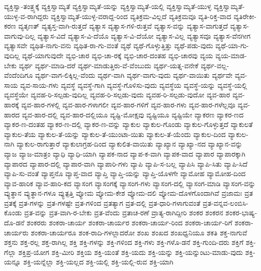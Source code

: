 {ವ್ಯಕ್ತಿಸ್ವಾ-ತಂತ್ರ್ಯಕ್ಕೆ
ವ್ಯಕ್ತಿಸ್ವಾಮ್ಯತೆ
ವ್ಯಕ್ತಿಸ್ವಾಮ್ಯತೆ-ಯನ್ನು
ವ್ಯಕ್ತಿಸ್ವಾಮ್ಯತೆ-ಯಲ್ಲಿ
ವ್ಯಕ್ತಿಸ್ವಾಮ್ಯತೆ-ಯುಳ್ಳ
ವ್ಯಕ್ತಿಸ್ವಾಮ್ಯತೆ-ಯುಳ್ಳ-ವ-ರಾಗಿದ್ದರು
ವ್ಯಕ್ತಿಸ್ವಾಮ್ಯತೆ-ಯುಳ್ಳ-ವರಾದ್ದ-ರಿಂದ
ವ್ಯತಿಕ್ರಮ-ವಿಲ್ಲದೆ
ವ್ಯತಿಕ್ರಮವೂ
ವ್ಯತಿ-ರಿಕ್ತ-ವಾದ
ವ್ಯತಿರೇಕೀ-ಕರಣ
ವ್ಯತೃಣತ್
ವ್ಯತ್ಯಸ್ತ-ವಾಗಿ-ರುತ್ತದೆ
ವ್ಯತ್ಯಾಸ
ವ್ಯತ್ಯಾಸ-ಗಳಿ-ರುತ್ತವೆ
ವ್ಯತ್ಯಾಸ-ವನ್ನು
ವ್ಯತ್ಯಾಸ-ವಾಗುತ್ತದೆ
ವ್ಯತ್ಯಾಸ-ವಾಗುವು-ದಿಲ್ಲ
ವ್ಯತ್ಯಾಸ-ವಿದೆ
ವ್ಯತ್ಯಾಸ-ವಿ-ದೆಯೊ
ವ್ಯತ್ಯಾಸ-ವಿ-ದೆಯೋ
ವ್ಯತ್ಯಾಸ-ವಿಲ್ಲ
ವ್ಯತ್ಯಾಸವೂ
ವ್ಯತ್ಯಾಸ-ವೆನಗೀಗ
ವ್ಯತ್ಯಾಸವೇ
ವ್ಯಥಿತ-ನಾಗು-ವನು
ವ್ಯಥಿತ-ರಾ-ಗು-ವಂತೆ
ವ್ಯಥೆ
ವ್ಯಥೆ-ಗೊಳ್ಳುತ್ತಿತ್ತು
ವ್ಯಥೆ-ಪಡು-ವುದು
ವ್ಯಥೆ-ಯಾ-ಗು-ವುದಿಲ್ಲ
ವ್ಯಥೆ-ಯಾಗುವುದೇ
ವ್ಯಭಿ-ಚಾರ
ವ್ಯಭಿ-ಚಾ-ರಕ್ಕೆ
ವ್ಯಭಿ-ಚಾರ-ದಂತಹ
ವ್ಯಭಿ-ಚಾರವು
ವ್ಯಯ
ವ್ಯಯ-ಮಾಡ-ಬೇಕು
ವ್ಯರ್ಥ
ವ್ಯರ್ಥ-ಮಾಡಿ-ದರೆ
ವ್ಯರ್ಥ-ಮಾಡುತ್ತಿರು-ವೆ-ವೆಂಬುದು
ವ್ಯರ್ಥ-ಯತ್ನ-ವನೇಕೆ
ವ್ಯರ್ಥ-ವಲ್ಲ-ವೆಂದೆಂದಿಗೂ
ವ್ಯರ್ಥ-ವಾಗ-ಲಿಕ್ಕಿಲ್ಲ-ವೆಂದು
ವ್ಯರ್ಥ-ವಾಗಿ
ವ್ಯರ್ಥ-ವಾಗು-ವುದು
ವ್ಯರ್ಥ-ವಾಯಿತು
ವ್ಯರ್ಥವೇ
ವ್ಯವ-ಸಾಯ
ವ್ಯವ-ಸಾಯ-ಗಳು
ವ್ಯವಸ್ಥೆ
ವ್ಯವಸ್ಥೆ-ಗಾಗಿ
ವ್ಯವಸ್ಥೆ-ಗೊಳಿಸು-ವುದು
ವ್ಯವಸ್ಥೆಯ
ವ್ಯವಸ್ಥೆ-ಯನ್ನು
ವ್ಯವಸ್ಥೆ-ಯಲ್ಲಿ
ವ್ಯವಸ್ಥೆಯೇ
ವ್ಯವಹ-ರಿ-ಸಲ್ಪಡು-ವುದಿಲ್ಲ
ವ್ಯವಹ-ರಿ-ಸಲ್ಪಡು-ವುದು
ವ್ಯವಹ-ರಿ-ಸಲ್ಪಡು-ವುದೋ
ವ್ಯವ-ಹಾರ
ವ್ಯವ-ಹಾರಕ್ಕೆ
ವ್ಯವ-ಹಾರ-ಗಳಲ್ಲಿ
ವ್ಯವ-ಹಾರ-ಗಳಾಗಲೀ
ವ್ಯವ-ಹಾರ-ಗಳಿಗೆ
ವ್ಯವ-ಹಾರ-ಗಳು
ವ್ಯವ-ಹಾರ-ಗಳೆಲ್ಲವೂ
ವ್ಯವ-ಹಾರದ
ವ್ಯವ-ಹಾರ-ದಲ್ಲಿ
ವ್ಯವ-ಹಾರ-ದಲ್ಲಿಯೂ
ವ್ಯಷ್ಟಿ-ಮೋಕ್ಷವು
ವ್ಯಷ್ಟಿಯೂ
ವ್ಯಷ್ಟಿಯೇ
ವ್ಯಾಕರಣ
ವ್ಯಾಕರ-ಣದ
ವ್ಯಾಕರ-ಣ-ದಂತಹ
ವ್ಯಾಕರ-ಣ-ದಲ್ಲಿ
ವ್ಯಾಕರ-ಣ-ವನ್ನು
ವ್ಯಾಕುಲ
ವ್ಯಾಕುಲ-ಗೊಂಡು
ವ್ಯಾಕುಲ-ಗೊಳ್ಳುತ್ತದೆ
ವ್ಯಾಕುಲತೆ
ವ್ಯಾಕುಲ-ತೆಯ
ವ್ಯಾಕುಲ-ತೆ-ಯನ್ನು
ವ್ಯಾಕುಲ-ತೆ-ಯುಂಟಾ-ಯಿತು
ವ್ಯಾಕುಲ-ತೆ-ಯೆಂದು
ವ್ಯಾಕುಲ-ದಿಂದ
ವ್ಯಾಕುಲ-ನಾಗಿ
ವ್ಯಾಕುಲ-ರಾಗುತ್ತಾರೆ
ವ್ಯಾಕುಲಾಗ್ರಹ-ದಿಂದ
ವ್ಯಾಕುಲಿತ-ವಾಯಿತು
ವ್ಯಾಖ್ಯಾನ
ವ್ಯಾಖ್ಯಾ-ನದ
ವ್ಯಾಖ್ಯಾನ-ವನ್ನು
ವ್ಯಾಜ
ವ್ಯಾಜ-ಮಾತ್ರಂ
ವ್ಯಾಧಿ
ವ್ಯಾಧಿ-ಯಾಗಿ
ವ್ಯಾಪಕ-ನಾದ
ವ್ಯಾಪ-ಕ-ವಾಗಿ
ವ್ಯಾಪಕ-ವಾದ
ವ್ಯಾಪಾರ
ವ್ಯಾಪಾರಕ್ಕಾಗಿ
ವ್ಯಾಪಾರದ
ವ್ಯಾಪಾರ-ದಲ್ಲಿ
ವ್ಯಾಪಾರ-ವಾಗಿ
ವ್ಯಾಪಾರಿ-ಗಳು
ವ್ಯಾಪಿ
ವ್ಯಾಪಿ-ಸ-ಬಲ್ಲ
ವ್ಯಾಪಿಸಿ
ವ್ಯಾಪಿ-ಸಿತು
ವ್ಯಾಪಿ-ಸಿದೆ
ವ್ಯಾಪಿ-ಸು-ವಂತೆ
ವ್ಯಾಪ್ತನೊ
ವ್ಯಾಪ್ತ-ವಾದ
ವ್ಯಾಪ್ತಿ
ವ್ಯಾಪ್ತಿ-ಯನ್ನು
ವ್ಯಾಪ್ತಿ-ಯೊಳಗೇ
ವ್ಯಾಮೋಹ
ವ್ಯಾಮೋಹ-ದಿಂದ
ವ್ಯಾವ-ಹಾರಿಕ
ವ್ಯಾವ-ಹಾರಿ-ಕದ
ವ್ಯಾಸಂಗ
ವ್ಯಾಸಂಗಕ್ಕೆ
ವ್ಯಾಸಂಗ-ಗಳು
ವ್ಯಾಸಂಗ-ದಲ್ಲಿ
ವ್ಯಾಸಂಗ-ಮಾಡಿ
ವ್ಯಾಸಂಗ-ವನ್ನು
ವ್ಯುತ್ಥಾನ
ವ್ಯುತ್ಥಾನ-ಗಳೂ
ವ್ಯುತ್ಪತ್ತಿ
ವ್ಯೋಮ
ವ್ಯೋಮ-ಕೇಶ
ವ್ಯೋಮ-ದಲಿ
ವ್ಯೋಮ-ದೊಳಗೊಂದಾಗಿವೆ
ವ್ರಜಾಮಃ
ವ್ರತ
ವ್ರತಕ್ಕೆ
ವ್ರತ-ಗಳನ್ನು
ವ್ರತ-ಗಳಷ್ಟೇ
ವ್ರತ-ಗಳಿಂದ
ವ್ರತತ್ಯಾಗ
ವ್ರತ-ದಲ್ಲಿ
ವ್ರತ-ಧಾರಿ-ಗಳಾಗುವಂತೆ
ವ್ರತ-ವನ್ನವ-ಲಂಬಿಸಿ-ಕೊಂಡು
ವ್ರತ-ವನ್ನು
ವ್ರತ-ವಾಗಿ-ರ-ಬೇಕು
ವ್ರತ-ವೆಂದು
ವ್ರತಾಚ-ರಣೆ
ವ್ರಾತ್ಯ-ರಾಗಿದ್ದೀರಿ
ಶಂಕರ
ಶಂಕರನ
ಶಂಕರ-ಭಾಷ್ಯ-ದೊ-ಡನೆ
ಶಂಕರರು
ಶಂಕರಾ-ಚಾರ್ಯ
ಶಂಕರಾ-ಚಾರ್ಯರ
ಶಂಕರಾ-ಚಾರ್ಯ-ರಿಂದ
ಶಂಕರಾ-ಚಾರ್ಯ-ರಿಗೆ
ಶಂಕರಾ-ಚಾರ್ಯರು
ಶಂಕರಾ-ಚಾರ್ಯರೂ
ಶಂಕ-ರಾದಿ-ಗಳಲ್ಲಾದರೋ
ಶಂಖ
ಶಂಖದ
ಶಂಖಧ್ವನಿಯೂ
ಶಕತಿ
ಶಕ್ತ-ನಾಗುವೆ
ಶಕ್ತನು
ಶಕ್ತ-ರಲ್ಲ
ಶಕ್ತ-ರಾಗಿಲ್ಲ
ಶಕ್ತಿ
ಶಕ್ತಿ-ಗಳನ್ನು
ಶಕ್ತಿ-ಗಳಿಂದ
ಶಕ್ತಿ-ಗಳು
ಶಕ್ತಿ-ಗಳೊ-ಡನೆ
ಶಕ್ತಿ-ಗುಂದಿ-ದರು
ಶಕ್ತಿಗೆ
ಶಕ್ತಿ-ಗೆಲ್ಲಾ
ಶಕ್ತಿಪ್ರ-ಯೋಗ
ಶಕ್ತಿ-ಮೀರಿ
ಶಕ್ತಿಯ
ಶಕ್ತಿ-ಯಂತೆ
ಶಕ್ತಿ-ಯದು
ಶಕ್ತಿ-ಯನ್ನು
ಶಕ್ತಿ-ಯನ್ನುಂಟು-ಮಾಡು-ವುದು
ಶಕ್ತಿ-ಯನ್ನೂ
ಶಕ್ತಿ-ಯನ್ನೆಲ್ಲಾ
ಶಕ್ತಿ-ಯಲ್ಲದ
ಶಕ್ತಿ-ಯಲ್ಲಿ
ಶಕ್ತಿ-ಯಲ್ಲಿ-ರುವ
ಶಕ್ತಿ-ಯಾಗಿ
}
